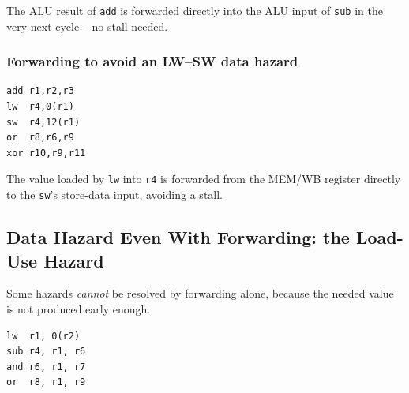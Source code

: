 \begin{center}
\end{center}
The ALU result of \texttt{add} is forwarded directly into the ALU input of
\texttt{sub} in the very next cycle -- no stall needed.

\subsubsection{Forwarding to avoid an LW--SW data hazard}

\begin{lstlisting}
add r1,r2,r3
lw  r4,0(r1)
sw  r4,12(r1)
or  r8,r6,r9
xor r10,r9,r11
\end{lstlisting}
\begin{note}
The value loaded by \texttt{lw} into \texttt{r4} is forwarded from the
MEM/WB register directly to the \texttt{sw}'s store-data input, avoiding a
stall.
\end{note}

\subsection{Data Hazard Even With Forwarding: the Load-Use Hazard}

\begin{remark}
Some hazards \emph{cannot} be resolved by forwarding alone, because the
needed value is not produced early enough.
\end{remark}

\begin{lstlisting}
lw  r1, 0(r2)
sub r4, r1, r6
and r6, r1, r7
or  r8, r1, r9
\end{lstlisting}

